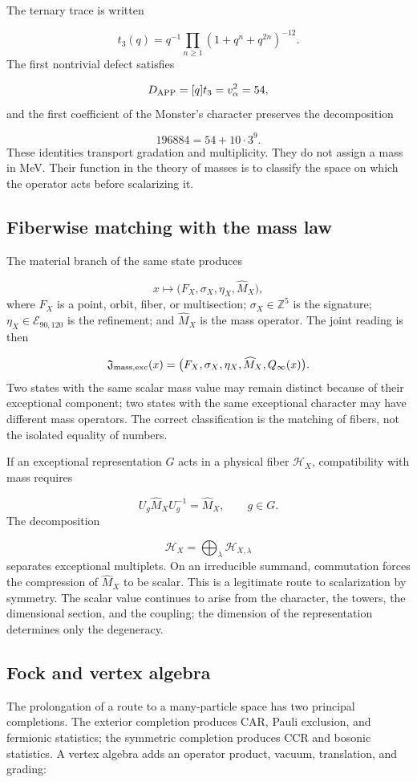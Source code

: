 The ternary trace is written

\[
t_3(q)=q^{-1}
\prod_{n\ge1}(1+q^n+q^{2n})^{-12}.
\]
The first nontrivial defect satisfies

\[
D_{\rm APP}=[q]t_3=v_\alpha^2=54,
\]
and the first coefficient of the Monster's character preserves the decomposition

\[
196884=54+10\cdot3^9.
\]
These identities transport gradation and multiplicity. They do not assign a mass in MeV. Their function in the theory of masses is to classify the space on which the operator acts before scalarizing it.

\subsection{Fiberwise matching with the mass law}
The material branch of the same state produces

\[
x\longmapsto
\bigl(F_X,\sigma_X,\eta_X,\widehat M_X\bigr),
\]
where \(F_X\) is a point, orbit, fiber, or multisection; \(\sigma_X\in\mathbb Z^5\) is the signature; \(\eta_X\in\mathcal E_{90,120}\) is the refinement; and \(\widehat M_X\) is the mass operator. The joint reading is then

\[
\mathfrak J_{\rm mass,exc}(x)
=\bigl(F_X,\sigma_X,\eta_X,\widehat M_X,Q_\infty(x)\bigr).
\]
Two states with the same scalar mass value may remain distinct because of their exceptional component; two states with the same exceptional character may have different mass operators. The correct classification is the matching of fibers, not the isolated equality of numbers.

If an exceptional representation \(G\) acts in a physical fiber \(\mathcal H_X\), compatibility with mass requires

\[
U_g\widehat M_XU_g^{-1}=\widehat M_X,
\qquad g\in G.
\]
The decomposition

\[
\mathcal H_X=\bigoplus_{\lambda}
\mathcal H_{X,\lambda}
\]
separates exceptional multiplets. On an irreducible summand, commutation forces the compression of \(\widehat M_X\) to be scalar. This is a legitimate route to scalarization by symmetry. The scalar value continues to arise from the character, the towers, the dimensional section, and the coupling; the dimension of the representation determines only the degeneracy.

\subsection{Fock and vertex algebra}
The prolongation of a route to a many-particle space has two principal completions. The exterior completion produces CAR, Pauli exclusion, and fermionic statistics; the symmetric completion produces CCR and bosonic statistics. A vertex algebra adds an operator product, vacuum, translation, and grading:

